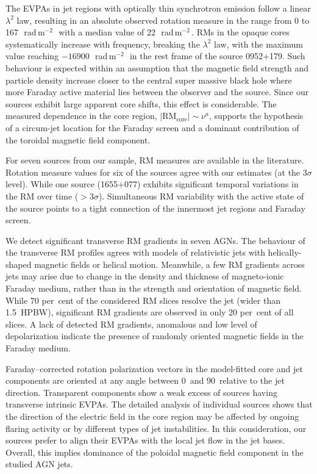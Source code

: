 \documentclass[a4paper,fleqn,usenatbib,useAMS]{mnras}
\newcommand{\rmu}{\,rad\,m$^{-2}$\,} %
\begin{document}
The EVPAs in jet regions with optically thin synchrotron emission follow a linear $\lambda^2$ law, resulting in an absolute observed rotation measure in the range from 0 to 167~\rmu\ with a median value of 22~\rmu. 
RMs in the opaque cores systematically increase with frequency, breaking the $\lambda^2$ law, with the maximum value reaching $-16900$~\rmu\ in the rest frame of the source 0952$+$179.
Such behaviour is expected within an assumption that the magnetic field strength and particle density increase closer to the central super massive black hole where more Faraday active material lies between the observer and the source.
Since our sources exhibit large apparent core shifts, this effect is considerable.
The measured dependence in the core region, $|\mathrm{RM}_\mathrm{core}|\sim\nu^a$, supports the hypothesis of a circum-jet location for the Faraday screen and a dominant contribution of the toroidal magnetic field component.

For seven sources from our sample, RM measures are available in the literature. 
Rotation measure values for six of the sources agree with our estimates (at the $3\sigma$ level). While one source (1655$+$077) exhibits significant temporal variations in the RM over time ($>3\sigma$).
Simultaneous RM variability with the active state of the source points to a tight connection of the innermost jet regions and Faraday screen.


We detect significant transverse RM gradients in seven AGNs.
The behaviour of the transverse RM profiles agrees with models of relativistic jets with helically-shaped magnetic fields or helical motion.
Meanwhile, a few RM gradients across jets may arise due to change in the density and thickness of magneto-ionic Faraday medium, rather than in the strength and orientation of magnetic field.
While 70 per~cent of the considered RM slices resolve the jet (wider than 1.5~HPBW), significant RM gradients are observed in only 20 per~cent of all slices.
A lack of detected RM gradients, anomalous and low level of depolarization indicate the presence of randomly oriented magnetic fields in the Faraday medium. 

Faraday--corrected rotation polarization vectors in the model-fitted core and jet components are oriented at any angle between 0\degr\ and 90\degr\ relative to the jet direction.
Transparent components show a weak excess of sources having transverse intrinsic EVPAs.
The detailed analysis of individual sources shows that the direction of the electric field in the core region may be affected by ongoing flaring activity or by different types of jet instabilities.
In this consideration, our sources prefer to align their EVPAs with the local jet flow in the jet bases.
Overall, this implies dominance of the poloidal magnetic field component in the studied AGN jets.
\end{document}
